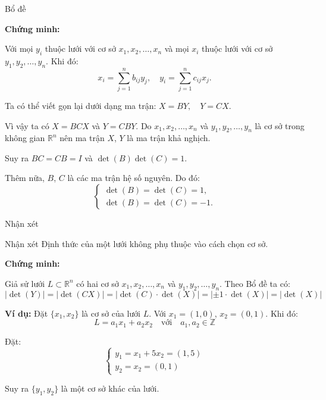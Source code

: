 \documentclass{beamer}
\begin{document}
\begin{frame}{Bổ đề}

\textbf{Chứng minh:}

Với mọi $y_i$ thuộc lưới với cơ sở $x_1, x_2, \ldots, x_n$ và mọi $x_i$ thuộc lưới với cơ sở $y_1, y_2, \ldots, y_n$. Khi đó:
\[
x_i = \sum_{j=1}^n b_{ij} y_j, \quad y_i = \sum_{j=1}^n c_{ij} x_j.
\]

Ta có thể viết gọn lại dưới dạng ma trận:
$X = BY, \quad Y = CX.$

Vì vậy ta có $X = BCX$ và $Y = CBY$. Do $x_1, x_2, \ldots, x_n$ và $y_1, y_2, \ldots, y_n$ là cơ sở trong không gian $\mathbb{R}^n$ nên ma trận $X$, $Y$ là ma trận khả nghịch.

Suy ra $BC = CB = I$ và $\det(B) \det(C) = 1$.

Thêm nữa, $B$, $C$ là các ma trận hệ số nguyên. Do đó:
\[
\begin{cases}
\det(B) = \det(C) = 1, \\
\det(B) = \det(C) = -1.
\end{cases}
\]

\end{frame}

\begin{frame}{Nhận xét}

\begin{block}{Nhận xét}
Định thức của một lưới không phụ thuộc vào cách chọn cơ sở.
\end{block}

\textbf{Chứng minh:}

Giả sử lưới $L \subset \mathbb{R}^n$ có hai cơ sở $x_1, x_2, \ldots, x_n$ và $y_1, y_2, \ldots, y_n$. Theo Bổ đề ta có:
\[
|\det(Y)| = |\det(CX)| = |\det(C) \cdot \det(X)| = |\pm 1 \cdot \det(X)| = |\det(X)|
\]

\textbf{Ví dụ:} Đặt $\{x_1, x_2\}$ là cơ sở của lưới $L$. Với $x_1 = (1, 0)$, $x_2 = (0, 1)$. Khi đó:
\[
L = a_1 x_1 + a_2 x_2 \quad \text{với} \quad a_1, a_2 \in \mathbb{Z}
\]

Đặt:
\[
\begin{cases}
y_1 = x_1 + 5x_2 = (1, 5) \\
y_2 = x_2 = (0, 1)
\end{cases}
\]

Suy ra $\{y_1, y_2\}$ là một cơ sở khác của lưới.

\end{frame}
\end{document}
